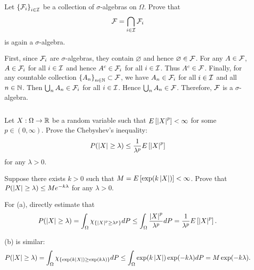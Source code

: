 \begin{exercise}{2.3}\label{ex:2.3}
    Let $\left\{ {\mathcal{F}_i} \right\}_{i\in\mathcal{I}}$ be a collection of $\sigma$-algebras on $\Omega$. Prove that 
    \begin{equation*}
        \mathcal{F} = \bigcap_{i\in\mathcal{I}} \mathcal{F}_i
    \end{equation*}
    is again a $\sigma$-algebra.
\end{exercise}
\begin{solution}
    First, since $\mathcal{F}_i$ are $\sigma$-algebras, they contain $\varnothing$ and hence 
    $\varnothing\in\mathcal{F}$. For any $A\in\mathcal{F}$, $A\in\mathcal{F}_i$ for all $i\in\mathcal{I}$ and hence 
    $A^c\in\mathcal{F}_i$ for all $i\in\mathcal{I}$. Thus $A^c\in\mathcal{F}$. Finally, for any countable 
    collection $\left\{ {A_n} \right\}_{n\in\mathbb{N}}\subset\mathcal{F}$, we have $A_n\in\mathcal{F}_i$ for all 
    $i\in\mathcal{I}$ and all $n\in\mathbb{N}$. Then $\bigcup_n A_n\in\mathcal{F}_i$ for all $i\in\mathcal{I}$. 
    Hence $\bigcup_n A_n\in\mathcal{F}$. Therefore, $\mathcal{F}$ is a $\sigma$-algebra.
\end{solution}

\begin{exercise}{2.4}\label{ex:2.4}$ $\vspace{-1.5em}
    \begin{thmenum}
        \item Let $X:\Omega\to\mathbb{R}$ be a random variable such that $E\left[ {\left\lvert {X} \right\rvert^p} \right]<\infty$ 
        for some $p\in(0,\infty)$. Prove the Chebyshev's inequality:
        \begin{equation*}
            P(\left\lvert {X} \right\rvert\geq \lambda) \leq \frac{1}{\lambda^p}E\left[ {\left\lvert {X} \right\rvert^p} \right]
        \end{equation*}
        for any $\lambda>0$. 
        \item Suppose there exists $k>0$ such that $M = E\left[ {\exp(k\left\lvert {X} \right\rvert)} \right]<\infty$. 
        Prove that $P(\left\lvert {X} \right\rvert\geq \lambda)\leq Me^{-k\lambda}$ for any $\lambda>0$.
    \end{thmenum}
\end{exercise}
\begin{solution}
    For (a), directly estimate that 
    \begin{equation*}
        P(\left\lvert {X} \right\rvert\geq \lambda) = \int_\Omega \chi_{\left\{ {\left\lvert {X} \right\rvert^p\geq \lambda^p} \right\}}dP 
        \leq \int_\Omega \frac{\left\lvert {X} \right\rvert^p}{\lambda^p}dP = \frac{1}{\lambda^p}E\left[ {\left\lvert {X} \right\rvert^p} \right].
    \end{equation*}

    (b) is similar: 
    \begin{equation*}
        P(\left\lvert {X} \right\rvert\geq \lambda) = \int_\Omega \chi_{\left\{ {\exp(k\left\lvert {X} \right\rvert)\geq \exp(k\lambda)} \right\}}dP 
        \leq \int_\Omega \exp(k\left\lvert {X} \right\rvert)\exp(-k\lambda)dP = M\exp(-k\lambda).
    \end{equation*}
\end{solution}

